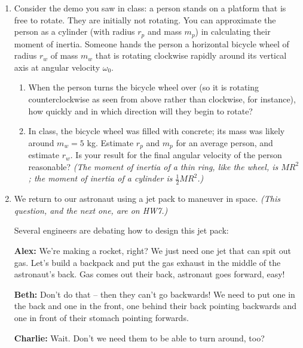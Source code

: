 \documentclass[12pt]{article}
\begin{document}
\begin{enumerate}

	\item Consider the demo you saw in class: a person stands on a platform that is free to rotate. They are initially not rotating. You can approximate the person as a cylinder (with radius $r_p$ and mass $m_p$) in calculating their moment of inertia.
		Someone hands the person a horizontal bicycle wheel of radius $r_w$ of mass $m_w$ that is rotating clockwise rapidly around its vertical axis at angular velocity $\omega_0$.

		\begin{enumerate}
			\item When the person turns the bicycle wheel over (so it is rotating counterclockwise as seen from above rather than clockwise, for instance), how quickly and in which direction will they begin to rotate?
\vspace{3in}
			\item In class, the bicycle wheel was filled with concrete; its mass was likely around $m_w = 5$ kg. Estimate $r_p$ and $m_p$ for an average person, and estimate $r_w$. Is your result for the final angular velocity of the person reasonable? {\it (The moment of inertia of a thin ring, like the wheel, is $MR^2$; the moment of inertia of a cylinder is $\frac{1}{2}MR^2$.)}
		\end{enumerate}
\newpage
	\item We return to our astronaut using a jet pack to maneuver in space. {\it (This question, and the next one, are on HW7.)}

		\begin{minipage}{0.6\textwidth}

			
		Several engineers are debating how to design this jet pack:

			\bigskip

		{\bf Alex:} We're making a rocket, right? We just need one jet that can spit out gas. Let's build a backpack and put the gas exhaust in the middle of the astronaut's back. Gas comes out their back, astronaut goes forward, easy!

\bigskip

		{\bf Beth:} Don't do that -- then they can't go backwards! We need to put one in the back and one in the front, one behind their back pointing backwards and one in front of their stomach pointing forwards.

\bigskip

		{\bf Charlie:} Wait. Don't we need them to be able to turn around, too?


\end{minipage}
\end{enumerate}
\end{document}
